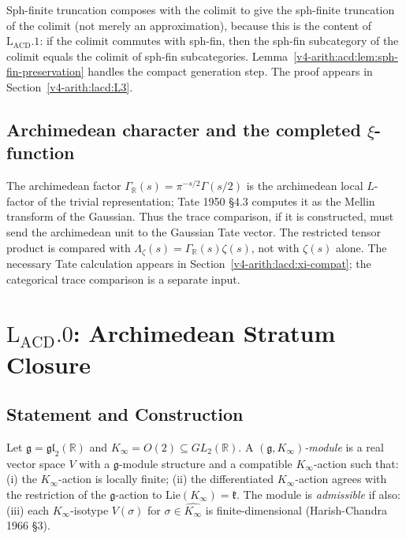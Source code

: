 Sph-finite truncation composes with the colimit to give the sph-finite
truncation of the colimit (not merely an approximation), because this is
the content of \(\mathrm{L}_{\mathrm{ACD}}.1\): if the colimit commutes with
sph-fin, then the sph-fin subcategory of the colimit equals the colimit of
sph-fin subcategories. Lemma~\ref{v4-arith:acd:lem:sph-fin-preservation}
handles the compact generation step. The proof appears in
Section~\ref{v4-arith:lacd:L3}.

\subsection{Archimedean character and the completed \(\xi\)-function}

The archimedean factor \(\Gamma_{\mathbb{R}}(s) = \pi^{-s/2}\Gamma(s/2)\)
is the archimedean local \(L\)-factor of the trivial representation;
Tate 1950 \S4.3 computes it as the Mellin transform of the Gaussian.
Thus the trace comparison, if it is constructed, must send the
archimedean unit to the Gaussian Tate vector. The restricted tensor
product is compared with
\(\Lambda_{\zeta}(s)=\Gamma_{\mathbb R}(s)\zeta(s)\), not with
\(\zeta(s)\) alone. The necessary Tate calculation appears in
Section~\ref{v4-arith:lacd:xi-compat}; the categorical trace comparison is a
separate input.

\section{\(\mathrm{L}_{\mathrm{ACD}}.0\): Archimedean Stratum Closure}
\label{v4-arith:lacd:L0}

\subsection{Statement and Construction}

\begin{definition}
\label{v4-arith:lacd:def:arch-admissible}
Let \(\mathfrak{g} = \mathfrak{gl}_{2}(\mathbb{R})\) and \(K_{\infty} = O(2)
\subseteq GL_{2}(\mathbb{R})\). A \emph{\((\mathfrak{g}, K_{\infty})\)-module}
is a real vector space \(V\) with a \(\mathfrak{g}\)-module structure and
a compatible \(K_{\infty}\)-action such that: (i) the \(K_{\infty}\)-action
is locally finite; (ii) the differentiated \(K_{\infty}\)-action agrees
with the restriction of the \(\mathfrak{g}\)-action to
\(\mathrm{Lie}(K_{\infty}) = \mathfrak{k}\). The module is \emph{admissible}
if also: (iii) each \(K_{\infty}\)-isotype \(V(\sigma)\) for
\(\sigma \in \widehat{K_{\infty}}\) is finite-dimensional (Harish-Chandra
1966 \S3).
\end{definition}

